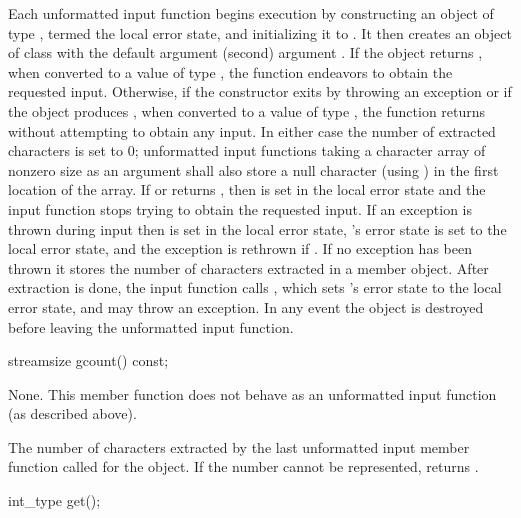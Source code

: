 \pnum
Each unformatted input function begins execution by constructing
an object of type , termed the local error state, and
initializing it to .
It then creates an object of class
with the default argument
(second) argument
.
If the
object returns
,
when converted to a value of type
,
the function endeavors
to obtain the requested input.
Otherwise, if the  constructor exits by throwing an exception or if
the  object produces , when converted to a value of type
,
the function returns without attempting to obtain any input.
In either case the number of extracted characters is set to 0;
unformatted input functions taking a character array of nonzero size as
an argument shall also store a null character (using
)
in the first location of the array.
If  or 
returns , then
 is set in the local error state and
the input function stops trying to obtain the requested input.
If an exception is thrown during input then
 is set in the local error state,
's error state is set to the local error state, and
the exception is rethrown if .
If no exception has been thrown it
stores the number of characters extracted
in a member object.
After extraction is done, the input function calls , which
sets 's error state to the local error state, and
may throw an exception.
In any event the
object
is destroyed before leaving the unformatted input function.

%
\begin{itemdecl}
streamsize gcount() const;
\end{itemdecl}

\begin{itemdescr}
\pnum
\effects
None.
This member function does not behave as an unformatted
input function (as described above).

\pnum
\returns
The number of characters
extracted by the last unformatted input member function called for the object.
If the number cannot be represented,
returns .
\end{itemdescr}

%
\begin{itemdecl}
int_type get();
\end{itemdecl}

